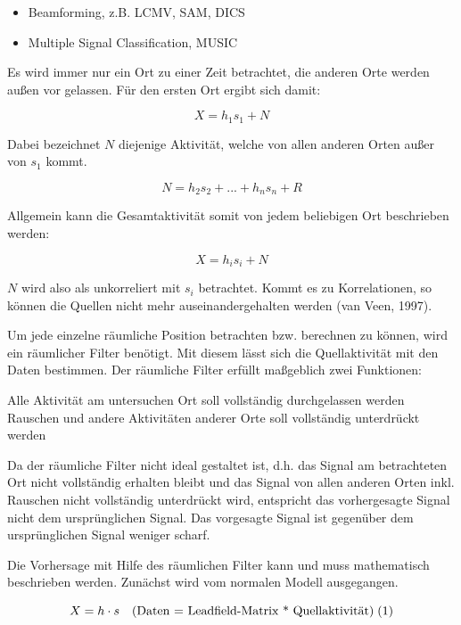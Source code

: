 \documentclass[doc,a4paper,12pt]{apa6}
\begin{document}
\begin{itemize}
\item Beamforming, z.B. LCMV, SAM, DICS
\item Multiple Signal Classification, MUSIC
\end{itemize}

Es wird immer nur ein Ort zu einer Zeit betrachtet, die anderen Orte werden außen vor gelassen. Für den ersten Ort ergibt sich damit:

\begin{equation}
X = h_1 s_1 + N
\end{equation}

Dabei bezeichnet $N$ diejenige Aktivität, welche von allen anderen Orten außer von $s_1$ kommt.

\begin{equation}
N = h_2 s_2 + ... + h_n s_n + R
\end{equation}

Allgemein kann die Gesamtaktivität somit von jedem beliebigen Ort beschrieben werden:

\begin{equation}
X = h_i s_i + N
\end{equation}

$N$ wird also als unkorreliert mit $s_i$ betrachtet. Kommt es zu Korrelationen, so können die Quellen nicht mehr auseinandergehalten werden (van Veen, 1997).

Um jede einzelne räumliche Position betrachten bzw. berechnen zu können, wird ein räumlicher Filter benötigt. Mit diesem lässt sich die Quellaktivität mit den Daten bestimmen. Der räumliche Filter erfüllt maßgeblich zwei Funktionen:

Alle Aktivität am untersuchen Ort soll vollständig durchgelassen werden
Rauschen und andere Aktivitäten anderer Orte soll vollständig unterdrückt werden

Da der räumliche Filter nicht ideal gestaltet ist, d.h. das Signal am betrachteten Ort nicht vollständig erhalten bleibt und das Signal von allen anderen Orten inkl. Rauschen nicht vollständig unterdrückt wird, entspricht das vorhergesagte Signal nicht dem ursprünglichen Signal. Das vorgesagte Signal ist gegenüber dem ursprünglichen Signal weniger scharf.

Die Vorhersage mit Hilfe des räumlichen Filter kann und muss mathematisch beschrieben werden. Zunächst wird vom normalen Modell ausgegangen. 

\begin{equation}
X = h \cdot s \quad \text{(Daten = Leadfield-Matrix * Quellaktivität)} \; (1) \\
\end{equation}
\end{document}
